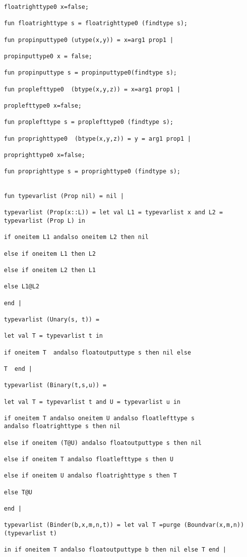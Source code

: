 \documentclass{article}
\begin{document}
{{\begin{verbatim}
floatrighttype0 x=false;

fun floatrighttype s = floatrighttype0 (findtype s);

fun propinputtype0 (utype(x,y)) = x=arg1 prop1 |

propinputtype0 x = false;

fun propinputtype s = propinputtype0(findtype s);

fun proplefttype0  (btype(x,y,z)) = x=arg1 prop1 |

proplefttype0 x=false;

fun proplefttype s = proplefttype0 (findtype s);

fun proprighttype0  (btype(x,y,z)) = y = arg1 prop1 |

proprighttype0 x=false;

fun proprighttype s = proprighttype0 (findtype s);


fun typevarlist (Prop nil) = nil |

typevarlist (Prop(x::L)) = let val L1 = typevarlist x and L2 = typevarlist (Prop L) in

if oneitem L1 andalso oneitem L2 then nil

else if oneitem L1 then L2

else if oneitem L2 then L1

else L1@L2

end |

typevarlist (Unary(s, t)) = 

let val T = typevarlist t in

if oneitem T  andalso floatoutputtype s then nil else

T  end |

typevarlist (Binary(t,s,u)) = 

let val T = typevarlist t and U = typevarlist u in

if oneitem T andalso oneitem U andalso floatlefttype s 
andalso floatrighttype s then nil

else if oneitem (T@U) andalso floatoutputtype s then nil

else if oneitem T andalso floatlefttype s then U

else if oneitem U andalso floatrighttype s then T

else T@U

end |

typevarlist (Binder(b,x,m,n,t)) = let val T =purge (Boundvar(x,m,n)) (typevarlist t) 

in if oneitem T andalso floatoutputtype b then nil else T end |


\end{verbatim}}}
\end{document}
